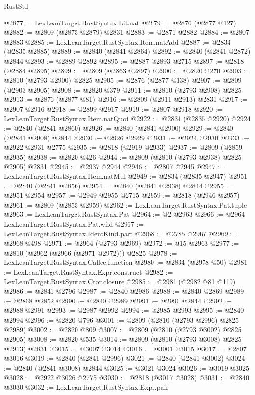\begin{lexlean}{RustStd}
\begin{coremodule}
{\begin{coremodule}
{{{{{{{{{{{{{{{{{{{{{{{{{{{{{{{{{@2877 := LexLeanTarget.RustSyntax.Lit.nat
@2879 := @2876 (@2877 @127)
@2882 := @2809 (@2875 @2879) @2831
@2883 := @2871 @2882
@2884 := @2807 @2883
@2885 := LexLeanTarget.RustSyntax.Item.natAdd
@2887 := @2834 (@2835 @2885)
@2889 := @2840 (@2841 @2864)
@2892 := @2840 (@2841 @2872) @2844
@2893 := @2889 @2892
@2895 := @2887 @2893 @2715
@2897 := @2818 (@2884 @2895)
@2899 := @2809 (@2863 @2897)
@2900 := @2820 @270
@2903 := @2810 (@2793 @2900) @2825
@2905 := @2876 (@2877 @138)
@2907 := @2809 (@2903 @2905)
@2908 := @2820 @379
@2911 := @2810 (@2793 @2908) @2825
@2913 := @2876 (@2877 @81)
@2916 := @2809 (@2911 @2913) @2831
@2917 := @2907 @2916
@2918 := @2899 @2917
@2919 := @2807 @2918
@2920 := LexLeanTarget.RustSyntax.Item.natQuot
@2922 := @2834 (@2835 @2920)
@2924 := @2840 (@2841 @2860)
@2926 := @2840 (@2841 @2900)
@2929 := @2840 (@2841 @2908) @2844
@2930 := @2926 @2929
@2931 := @2924 @2930
@2933 := @2922 @2931 @2775
@2935 := @2818 (@2919 @2933)
@2937 := @2809 (@2859 @2935)
@2938 := @2820 @426
@2944 := @2809 (@2810 (@2793 @2938) @2825 @2905) @2831
@2945 := @2937 @2944
@2946 := @2807 @2945
@2947 := LexLeanTarget.RustSyntax.Item.natMul
@2949 := @2834 (@2835 @2947)
@2951 := @2840 (@2841 @2856)
@2954 := @2840 (@2841 @2938) @2844
@2955 := @2951 @2954
@2957 := @2949 @2955 @2715
@2959 := @2818 (@2946 @2957)
@2961 := @2809 (@2855 @2959)
@2962 := LexLeanTarget.RustSyntax.Pat.tuple
@2963 := LexLeanTarget.RustSyntax.Pat
@2964 := @2 @2963
@2966 := @2964 LexLeanTarget.RustSyntax.Pat.wild
@2967 := LexLeanTarget.RustSyntax.IdentKind.part
@2968 := @2785 @2967
@2969 := @2968 @498
@2971 := @2964 (@2793 @2969)
@2972 := @15 @2963
@2977 := @2810 (@2962 (@2966 (@2971 @2972))) @2825
@2978 := LexLeanTarget.RustSyntax.Callee.function
@2980 := @2834 (@2978 @50)
@2981 := LexLeanTarget.RustSyntax.Expr.construct
@2982 := LexLeanTarget.RustSyntax.Ctor.closure
@2985 := @2981 (@2982 @81 @110)
@2986 := @2841 @2796
@2987 := @2840 @2986
@2988 := @2840 @2869
@2989 := @2868 @2852
@2990 := @2840 @2989
@2991 := @2990 @2844
@2992 := @2988 @2991
@2993 := @2987 @2992
@2994 := @2985 @2993
@2995 := @2840 @2994
@2996 := @2820 @796
@3001 := @2809 (@2810 (@2793 @2996) @2825 @2989)
@3002 := @2820 @809
@3007 := @2809 (@2810 (@2793 @3002) @2825 @2905)
@3008 := @2820 @535
@3014 := @2809 (@2810 (@2793 @3008) @2825 @2913) @2831
@3015 := @3007 @3014
@3016 := @3001 @3015
@3017 := @2807 @3016
@3019 := @2840 (@2841 @2996)
@3021 := @2840 (@2841 @3002)
@3024 := @2840 (@2841 @3008) @2844
@3025 := @3021 @3024
@3026 := @3019 @3025
@3028 := @2922 @3026 @2775
@3030 := @2818 (@3017 @3028)
@3031 := @2840 @3030
@3032 := LexLeanTarget.RustSyntax.Expr.pair
}}}}}}}}}}}}}}}}}}}}}}}}}}}}}}}}}
\end{coremodule}}
\end{coremodule}
\end{lexlean}
